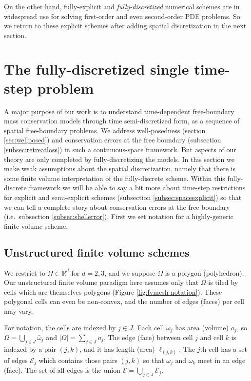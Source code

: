 \documentclass[final,leqno,onefignum,onetabnum]{siamltex1213bueler}
\newcommand\RR{\mathbb{R}}
\begin{document}
On the other hand, fully-explicit and \emph{fully-discretized} numerical schemes are in widespread use for solving first-order and even second-order PDE problems.  So we return to these explicit schemes after adding spatial discretization in the next section.


\section{The fully-discretized single time-step problem}  \label{sec:spacediscretized}   A major purpose of our work is to understand time-dependent free-boundary mass conservation models through time semi-discretized form, as a sequence of spatial free-boundary problems.  We address well-posedness (section \ref{sec:wellposed}) and conservation errors at the free boundary (subsection \ref{subsec:retreatloss}) in such a continuous-space framework.  But aspects of our theory are only completed by fully-discretizing the models.  In this section we make weak assumptions about the spatial discretization, namely that there is some finite volume \cite{LeVeque2002} interpretation of the fully-discrete scheme.  Within this fully-discrete framework we will be able to say a bit more about time-step restrictions for explicit and semi-explicit schemes (subsection \ref{subsec:spaceexplicit}) so that we can tell a complete story about conservation errors at the free boundary (i.e.~subsection \ref{subsec:shellerror}).  First we set notation for a highly-generic finite volume scheme.

\subsection{Unstructured finite volume schemes} \label{subsec:spacenotation}  We restrict to $\Omega \subset \RR^d$ for $d=2,3$, and we suppose $\Omega$ is a polygon (polyhedron).  Our unstructured finite volume paradigm here assumes only that $\Omega$ is tiled by cells which are themselves polygons (Figure \ref{fig:fvmesh-notation}).  These polygonal cells can even be non-convex, and the number of edges (faces) per cell may vary.

For notation, the cells are indexed by $j\in J$.  Each cell $\omega_j$ has area (volume) $a_j$, so $\bar\Omega = \bigcup_{j\in J} \bar \omega_j$ and $|\Omega| = \sum_{j\in J} a_j$.  The edge (face) between cell $j$ and cell $k$ is indexed by a pair $(j,k)$, and it has length (area) $\ell_{(j,k)}$.  The $j$th cell has a set of edges $\mathcal{E}_j$ which contains those pairs $(j,k)$ so that $\omega_j$ and $\omega_k$ meet in an edge (face).  The set of all edges is the union $\mathcal{E} = \bigcup_{j\in J} \mathcal{E}_j$.
\end{document}
